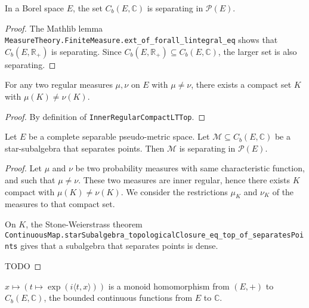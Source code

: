 \begin{lemma}\label{lem:bounded_continuous_separating}
In a Borel space $E$, the set $C_b(E, \mathbb{C})$ is separating in $\mathcal P(E)$.
\end{lemma}

\begin{proof}
The Mathlib lemma \texttt{MeasureTheory.FiniteMeasure.ext\_of\_forall\_lintegral\_eq} shows that $C_b(E, \mathbb{R}_+)$ is separating. Since $C_b(E, \mathbb{R}_{+}) \subseteq C_b(E, \mathbb{C})$, the larger set is also separating.
\end{proof}

\begin{lemma}\label{lem:innerRegular_ne_iff_compact}
For any two regular measures $\mu, \nu$ on $E$ with $\mu \ne \nu$, there exists a compact set $K$ with $\mu(K) \ne \nu(K)$.
\end{lemma}

\begin{proof}
By definition of \texttt{InnerRegularCompactLTTop}.
\end{proof}

\begin{theorem}\label{thm:separating_starSubalgebra}
Let $E$ be a complete separable pseudo-metric space. Let $\mathcal M \subseteq C_b(E, \mathbb{C})$ be a star-subalgebra that separates points. Then $\mathcal M$ is separating in $\mathcal P(E)$.
\end{theorem}

\begin{proof}
Let $\mu$ and $\nu$ be two probability measures with same characteristic function, and such that $\mu \ne \nu$.
These two measures are inner regular, hence there exists $K$ compact with $\mu(K) \ne \nu(K)$.
We consider the restrictions $\mu_K$ and $\nu_K$ of the measures to that compact set.

On $K$, the Stone-Weierstrass theorem \texttt{ContinuousMap.starSubalgebra\_topologicalClosure\_eq\_top\_of\_separatesPoints} gives that a subalgebra that separates points is dense.

TODO
\end{proof}

\begin{lemma}\label{lem:exp_character}
$x \mapsto (t \mapsto \exp(i \langle t, x \rangle))$ is a monoid homomorphism from $(E,+)$ to $C_b(E, \mathbb{C})$, the bounded continuous functions from $E$ to $\mathbb{C}$.
\end{lemma}

